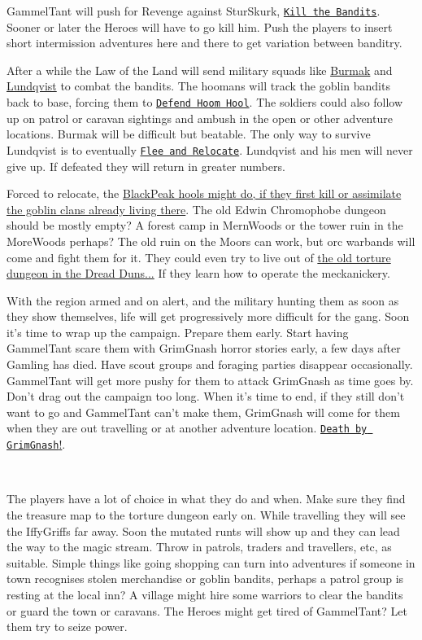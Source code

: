 GammelTant will push for Revenge against SturSkurk, \hyperref[02killthebandits]{\texttt{Kill the Bandits}}. Sooner or later the Heroes will have to go kill him. Push the players to insert short intermission adventures here and there to get variation between banditry.

After a while the Law of the Land will send military squads like \hyperref[appendixburmak]{Burmak} and \hyperref[appendixlundqvist]{Lundqvist} to combat the bandits. The hoomans will track the goblin bandits back to base, forcing them to \hyperref[03defendhoomhool]{\texttt{Defend Hoom Hool}}. The soldiers could also follow up on patrol or caravan sightings and ambush in the open or other adventure locations. Burmak will be difficult but beatable. The only way to survive Lundqvist is to eventually \hyperref[04fleeandrelocate]{\texttt{Flee and Relocate}}. Lundqvist and his men will never give up. If defeated they will return in greater numbers.

Forced to relocate, the \hyperref[appendixmountaingoblins]{BlackPeak hools might do, if they first kill or assimilate the goblin clans already living there}. The old Edwin Chromophobe dungeon should be mostly empty? A forest camp in MernWoods or the tower ruin in the MoreWoods perhaps? The old ruin on the Moors can work, but orc warbands will come and fight them for it. They could even try to live out of \hyperref[appendixtorturedungeon]{the old torture dungeon in the Dread Duns...} If they learn how to operate the meckanickery.

With the region armed and on alert, and the military hunting them as soon as they show themselves, life will get progressively more difficult for the gang. Soon it's time to wrap up the campaign. Prepare them early. Start having GammelTant scare them with GrimGnash horror stories early, a few days after Gamling has died. Have scout groups and foraging parties disappear occasionally. GammelTant will get more pushy for them to attack GrimGnash as time goes by. Don't drag out the campaign too long. When it's time to end, if they still don't want to go and GammelTant can't make them, GrimGnash will come for them when they are out travelling or at another adventure location. \hyperref[05deathbygrimgnash]{\texttt{Death by GrimGnash}!}.

\

The players have a lot of choice in what they do and when. Make sure they find the treasure map to the torture dungeon early on. While travelling they will see the IffyGriffs far away. Soon the mutated runts will show up and they can lead the way to the magic stream. Throw in patrols, traders and travellers, etc, as suitable. Simple things like going shopping can turn into adventures if someone in town recognises stolen merchandise or goblin bandits, perhaps a patrol group is resting at the local inn? A village might hire some warriors to clear the bandits or guard the town or caravans. The Heroes might get tired of GammelTant? Let them try to seize power.

